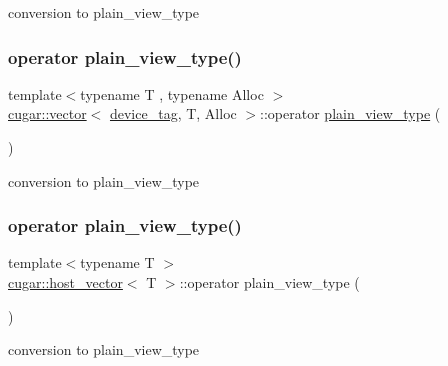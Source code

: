 conversion to plain\+\_\+view\+\_\+type \mbox{\label{group___basic_ga5cdeb00ca2a3ec211fe5ceccbc9b0a20}} 
\subsubsection{\texorpdfstring{operator plain\+\_\+view\+\_\+type()}{operator plain\_view\_type()}\hspace{0.1cm}{\footnotesize\ttfamily [2/5]}}
{\footnotesize\ttfamily template$<$typename T , typename Alloc $>$ \\
\hyperlink{structcugar_1_1vector}{cugar\+::vector}$<$ \hyperlink{structcugar_1_1device__tag}{device\+\_\+tag}, T, Alloc $>$\+::operator \hyperlink{structcugar_1_1vector__view}{plain\+\_\+view\+\_\+type} (\begin{DoxyParamCaption}{ }\end{DoxyParamCaption})\hspace{0.3cm}{\ttfamily [inline]}}

conversion to plain\+\_\+view\+\_\+type \mbox{\label{group___basic_gafa4904073d10ce73dc33dfb69013b501}} 
\subsubsection{\texorpdfstring{operator plain\+\_\+view\+\_\+type()}{operator plain\_view\_type()}\hspace{0.1cm}{\footnotesize\ttfamily [3/5]}}
{\footnotesize\ttfamily template$<$typename T $>$ \\
\hyperlink{structcugar_1_1host__vector}{cugar\+::host\+\_\+vector}$<$ T $>$\+::operator plain\+\_\+view\+\_\+type (\begin{DoxyParamCaption}{ }\end{DoxyParamCaption})\hspace{0.3cm}{\ttfamily [inline]}}

conversion to plain\+\_\+view\+\_\+type \mbox{\label{group___basic_gaf23abbba65db2e117920090f0f97ed72}} 
